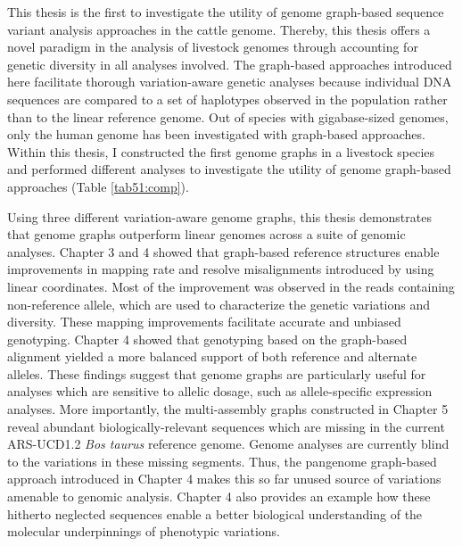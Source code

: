 \documentclass[../main.tex]{subfiles}
\begin{document}
\fi


\graphicspath{{figure/}{../figure/}}

\clearpage
\onehalfspacing

\linespread{1.25}
\setlength{\parskip}{\baselineskip}

\normalsize

This thesis is the first to investigate the utility of genome graph-based sequence variant analysis approaches in the cattle genome. Thereby, this thesis offers a novel paradigm in the analysis of livestock genomes through accounting for genetic diversity in all analyses involved. The graph-based approaches introduced here facilitate thorough variation-aware genetic analyses because individual DNA sequences are compared to a set of haplotypes observed in the population rather than to the linear reference genome. Out of species with gigabase-sized genomes, only the human genome has been investigated with graph-based approaches. Within this thesis, I constructed the first genome graphs in a livestock species and performed different analyses to investigate the utility of genome graph-based approaches (Table \ref{tab51:comp}).


Using three different variation-aware genome graphs, this thesis demonstrates that genome graphs outperform linear genomes across a suite of genomic analyses. Chapter 3 and 4 showed that graph-based reference structures enable improvements in mapping rate and resolve misalignments introduced by using linear coordinates. Most of the improvement was observed in the reads containing non-reference allele, which are used to characterize the genetic variations and diversity. These mapping improvements facilitate accurate and unbiased genotyping. Chapter 4 showed that genotyping based on the graph-based alignment yielded a more balanced support of both reference and alternate alleles. These findings suggest that  genome graphs are particularly useful for analyses which are sensitive to allelic dosage, such as allele-specific expression analyses. More importantly, the multi-assembly graphs constructed in Chapter 5 reveal abundant biologically-relevant sequences which are missing in the current ARS-UCD1.2 \emph{Bos taurus} reference genome. Genome analyses are currently blind to the variations in these missing segments. Thus, the pangenome graph-based approach introduced in Chapter 4 makes this so far unused source of variations amenable to genomic analysis. Chapter 4 also provides an example how these hitherto neglected sequences enable a better biological understanding of the molecular underpinnings of phenotypic variations. 
\end{document}
